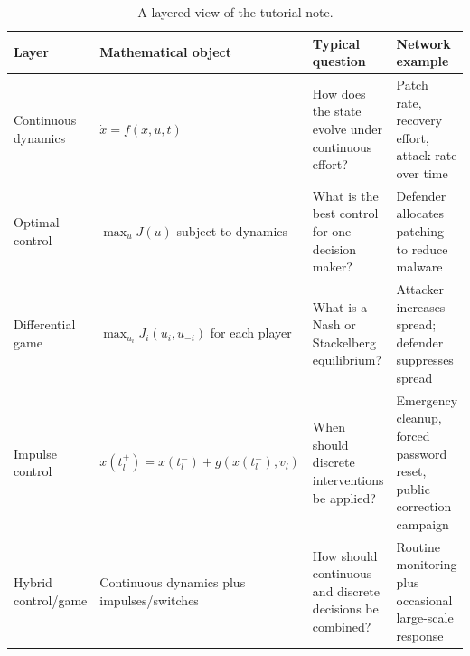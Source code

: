 \documentclass[11pt,a4paper]{article}
\begin{document}
\begin{table}[h!]
\centering
\caption{A layered view of the tutorial note.}
\begin{tabularx}{\textwidth}{L{2.9cm}L{3.5cm}Y Y}
\toprule
\textbf{Layer} & \textbf{Mathematical object} & \textbf{Typical question} & \textbf{Network example} \\
\midrule
Continuous dynamics & $\dot{x}=f(x,u,t)$ & How does the state evolve under continuous effort? & Patch rate, recovery effort, attack rate over time \\
Optimal control & $\max_u J(u)$ subject to dynamics & What is the best control for one decision maker? & Defender allocates patching to reduce malware \\
Differential game & $\max_{u_i} J_i(u_i,u_{-i})$ for each player & What is a Nash or Stackelberg equilibrium? & Attacker increases spread; defender suppresses spread \\
Impulse control & $x(t_l^+) = x(t_l^-) + g(x(t_l^-),v_l)$ & When should discrete interventions be applied? & Emergency cleanup, forced password reset, public correction campaign \\
Hybrid control/game & Continuous dynamics plus impulses/switches & How should continuous and discrete decisions be combined? & Routine monitoring plus occasional large-scale response \\
\bottomrule
\end{tabularx}
\end{table}
\end{document}
